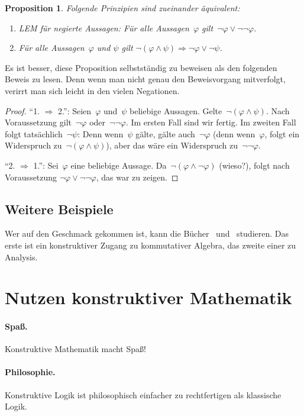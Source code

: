 \documentclass[a4paper,ngerman,12pt]{scrartcl}
\theoremstyle{definition}
\theoremstyle{plain}
\newtheorem{prop}[defn]{Proposition}
\theoremstyle{remark}
\renewcommand{\_}{\mathpunct{.}\,}
\newcommand{\?}{\,{:}\,}
\begin{document}
\begin{prop}Folgende Prinzipien sind zueinander äquivalent:
\begin{enumerate}
\item[1.] LEM für negierte Aussagen: Für alle Aussagen~$\varphi$
gilt~$\neg\varphi \vee \neg\neg\varphi$.
\item[2.] Für alle Aussagen~$\varphi$ und $\psi$ gilt $\neg(\varphi \wedge \psi)
\Longrightarrow \neg\varphi \vee \neg\psi$.
\end{enumerate}
\end{prop}
Es ist besser, diese Proposition selbstständig zu beweisen als den folgenden
Beweis zu lesen. Denn wenn man nicht genau den Beweisvorgang mitverfolgt,
verirrt man sich leicht in den vielen Negationen.
\begin{proof}"`1. $\Rightarrow$ 2."': Seien~$\varphi$ und~$\psi$ beliebige
Aussagen. Gelte~$\neg(\varphi \wedge \psi)$. Nach
Voraussetzung gilt~$\neg\varphi$ oder~$\neg\neg\varphi$. Im ersten Fall sind
wir fertig. Im zweiten Fall folgt tatsächlich~$\neg\psi$: Denn
wenn~$\psi$ gälte, gälte auch~$\neg\varphi$ (denn wenn~$\varphi$, folgt ein
Widerspruch zu~$\neg(\varphi \wedge \psi)$), aber das wäre ein Widerspruch
zu~$\neg\neg\varphi$.

"`2. $\Rightarrow$ 1."': Sei~$\varphi$ eine beliebige Aussage. Da~$\neg(\varphi
\wedge \neg\varphi)$ (wieso?), folgt nach Voraussetzung $\neg\varphi \vee
\neg\neg\varphi$, das war zu zeigen.
\end{proof}


\subsection{Weitere Beispiele}

Wer auf den Geschmack gekommen ist, kann die
Bücher~\cite{mines:richman:ruitenburg} und~\cite{bishop:bridges:bible}
studieren. Das erste ist ein konstruktiver Zugang zu kommutativer Algebra, das
zweite einer zu Analysis.


\section{Nutzen konstruktiver Mathematik}

\paragraph{Spaß.} Konstruktive Mathematik macht Spaß!

\paragraph{Philosophie.}
Konstruktive Logik ist philosophisch einfacher zu rechtfertigen als
klassische Logik.
\end{document}
